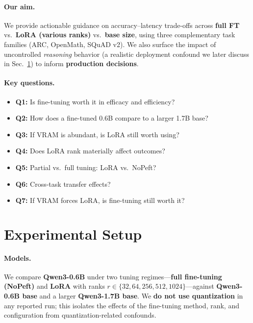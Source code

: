 \documentclass[11pt,a4paper]{article}
\begin{document}
\paragraph{Our aim.}
We provide actionable guidance on accuracy--latency trade-offs across \textbf{full FT} vs.\ \textbf{LoRA (various ranks)} vs.\ \textbf{base size}, using three complementary task families (ARC, OpenMath, SQuAD v2). We also surface the impact of uncontrolled \emph{reasoning} behavior (a realistic deployment confound we later discuss in Sec.~\ref{sec:setup}) to inform \textbf{production decisions}.

\paragraph{Key questions.}
\begin{itemize}
  \item \textbf{Q1:} Is fine-tuning worth it in efficacy and efficiency?
  \item \textbf{Q2:} How does a fine-tuned 0.6B compare to a larger 1.7B base?
  \item \textbf{Q3:} If VRAM is abundant, is LoRA still worth using?
  \item \textbf{Q4:} Does LoRA rank materially affect outcomes?
  \item \textbf{Q5:} Partial vs.\ full tuning: LoRA vs.\ NoPeft?
  \item \textbf{Q6:} Cross-task transfer effects?
  \item \textbf{Q7:} If VRAM forces LoRA, is fine-tuning still worth it?
\end{itemize}

\section{Experimental Setup}
\label{sec:setup}
\paragraph{Models.}
We compare \textbf{Qwen3-0.6B} under two tuning regimes—\textbf{full fine-tuning (NoPeft)} and \textbf{LoRA} with ranks $r\in\{32,64,256,512,1024\}$—against \textbf{Qwen3-0.6B base} and a larger \textbf{Qwen3-1.7B base}. We \textbf{do not use quantization} in any reported run; this isolates the effects of the fine-tuning method, rank, and configuration from quantization-related confounds.
\end{document}
